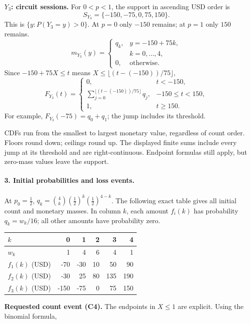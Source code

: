 \par\noindent\begin{minipage}[t]{.48\linewidth}\vspace{0pt}
\textbf{$Y_3$: circuit sessions.}
For $0<p<1$, the support in ascending USD order is
\[S_{Y_3}=\{-150,-75,0,75,150\}.\]
This is $\{y:P(Y_3=y)>0\}$. At $p=0$ only $-150$ remains; at $p=1$ only $150$ remains.
\[
m_{Y_3}(y)=\begin{cases}q_k,&y=-150+75k,\\&k=0,\ldots,4,\\0,&\text{otherwise}.\end{cases}
\]
Since $-150+75X\leq t$ means $X\leq \lfloor(t-(-150))/75\rfloor$,
\[
F_{Y_3}(t)=\begin{cases}0,&t<-150,\\\displaystyle \sum_{j=0}^{\lfloor(t-(-150))/75\rfloor}q_j,&-150\leq t<150,\\1,&t\geq 150.\end{cases}
\]
For example, $F_{Y_3}(-75)=q_0+q_1$; the jump includes its threshold.
\end{minipage}\par
CDFs run from the smallest to largest monetary value, regardless of count order. Floors round down; ceilings round up. The displayed finite sums include every jump at its threshold and are right-continuous. Endpoint formulas still apply, but zero-mass values leave the support.
\clearpage\paragraph{3. Initial probabilities and loss events.}
At $p_0=\frac{1}{2}$, $q_k=\binom{4}k(\frac{1}{2})^k(\frac{1}{2})^{4-k}$. The following exact table gives all initial count and monetary masses. In column $k$, each amount $f_i(k)$ has probability $q_k=w_k/16$; all other amounts have probability zero.
\begin{center}\begin{tabular}{lrrrrr}\toprule
$k$ & 0 & 1 & 2 & 3 & 4\\\midrule
$w_k$ & 1 & 4 & 6 & 4 & 1\\
$f_1(k)$ (USD) & -70 & -30 & 10 & 50 & 90\\
$f_2(k)$ (USD) & -30 & 25 & 80 & 135 & 190\\
$f_3(k)$ (USD) & -150 & -75 & 0 & 75 & 150\\
\bottomrule\end{tabular}\end{center}
\textbf{Requested count event (C4).} The endpoints in $X\leq 1$ are explicit. Using the binomial formula,
